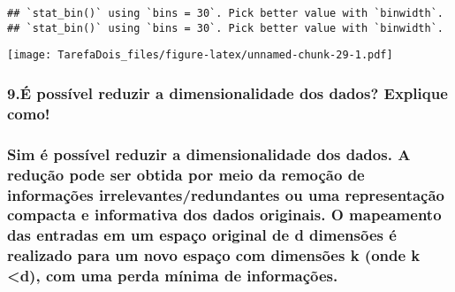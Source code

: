 \documentclass[
]{article}
\newenvironment{Shaded}{\begin{snugshade}}{\end{snugshade}}
\newcommand{\AttributeTok}[1]{\textcolor[rgb]{0.77,0.63,0.00}{#1}}
\newcommand{\DecValTok}[1]{\textcolor[rgb]{0.00,0.00,0.81}{#1}}
\newcommand{\FloatTok}[1]{\textcolor[rgb]{0.00,0.00,0.81}{#1}}
\newcommand{\FunctionTok}[1]{\textcolor[rgb]{0.00,0.00,0.00}{#1}}
\newcommand{\NormalTok}[1]{#1}
\newcommand{\SpecialCharTok}[1]{\textcolor[rgb]{0.00,0.00,0.00}{#1}}
\begin{document}
\begin{Shaded}
\end{Shaded}

\begin{verbatim}
## `stat_bin()` using `bins = 30`. Pick better value with `binwidth`.
## `stat_bin()` using `bins = 30`. Pick better value with `binwidth`.
\end{verbatim}

\texttt{[image: TarefaDois\_files/figure-latex/unnamed-chunk-29-1.pdf]}

\hypertarget{uxe9-possuxedvel-reduzir-a-dimensionalidade-dos-dados-explique-como}{%
\subsubsection{9.É possível reduzir a dimensionalidade dos dados?
Explique
como!}\label{uxe9-possuxedvel-reduzir-a-dimensionalidade-dos-dados-explique-como}}

\hypertarget{sim-uxe9-possuxedvel-reduzir-a-dimensionalidade-dos-dados.-a-reduuxe7uxe3o-pode-ser-obtida-por-meio-da-remouxe7uxe3o-de-informauxe7uxf5es-irrelevantesredundantes-ou-uma-representauxe7uxe3o-compacta-e-informativa-dos-dados-originais.-o-mapeamento-das-entradas-em-um-espauxe7o-original-de-d-dimensuxf5es-uxe9-realizado-para-um-novo-espauxe7o-com-dimensuxf5es-k-onde-k-d-com-uma-perda-muxednima-de-informauxe7uxf5es.}{%
\subsubsection{Sim é possível reduzir a dimensionalidade dos dados. A
redução pode ser obtida por meio da remoção de informações
irrelevantes/redundantes ou uma representação compacta e informativa dos
dados originais. O mapeamento das entradas em um espaço original de d
dimensões é realizado para um novo espaço com dimensões k (onde k
\textless d), com uma perda mínima de
informações.}\label{sim-uxe9-possuxedvel-reduzir-a-dimensionalidade-dos-dados.-a-reduuxe7uxe3o-pode-ser-obtida-por-meio-da-remouxe7uxe3o-de-informauxe7uxf5es-irrelevantesredundantes-ou-uma-representauxe7uxe3o-compacta-e-informativa-dos-dados-originais.-o-mapeamento-das-entradas-em-um-espauxe7o-original-de-d-dimensuxf5es-uxe9-realizado-para-um-novo-espauxe7o-com-dimensuxf5es-k-onde-k-d-com-uma-perda-muxednima-de-informauxe7uxf5es.}}
\end{document}

